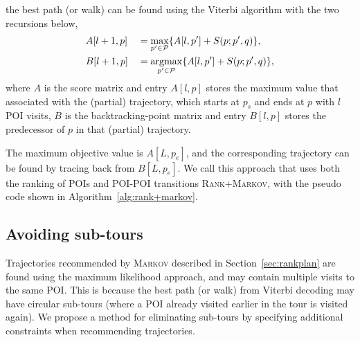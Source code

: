 the best path (or walk) can be found using the Viterbi algorithm with the two recursions below,
\begin{alignat}{2}
&A[l+1, p]   &&= \max_{p' \in \mathcal{P}} \{ A[l, p'] + S(p; p', q) \}, \label{eq:max} \\
&B[l+1, p]   &&= \operatorname*{argmax}_{p' \in \mathcal{P}} \{ A[l, p'] + S(p; p', q) \}, \label{eq:argmax}
\end{alignat}
where $A$ is the score matrix and entry $A[l, p]$ stores the maximum value that associated with the (partial) trajectory, 
which starts at $p_s$ and ends at $p$ with $l$ POI visits,
$B$ is the backtracking-point matrix and entry $B[l, p]$ stores the predecessor of $p$ in that (partial) trajectory.

The maximum objective value is $A[L, p_e]$,
and the corresponding trajectory can be found by tracing back from $B[L, p_e]$.
We call this approach that uses both the ranking of POIs and POI-POI transitions \textsc{Rank+Markov},
with the pseudo code shown in Algorithm~\ref{alg:rank+markov}.



\subsection{Avoiding sub-tours} %
\label{sec:nosubtour}

Trajectories recommended by \textsc{Markov} described in Section~\ref{sec:rankplan} are found
using the maximum likelihood approach, and may contain multiple visits to the same POI.
This is because the best path (or walk) from Viterbi decoding %
may have 
circular sub-tours (where a POI already visited earlier in the tour is visited again).
We propose a method for eliminating sub-tours by specifying additional constraints when recommending trajectories.

